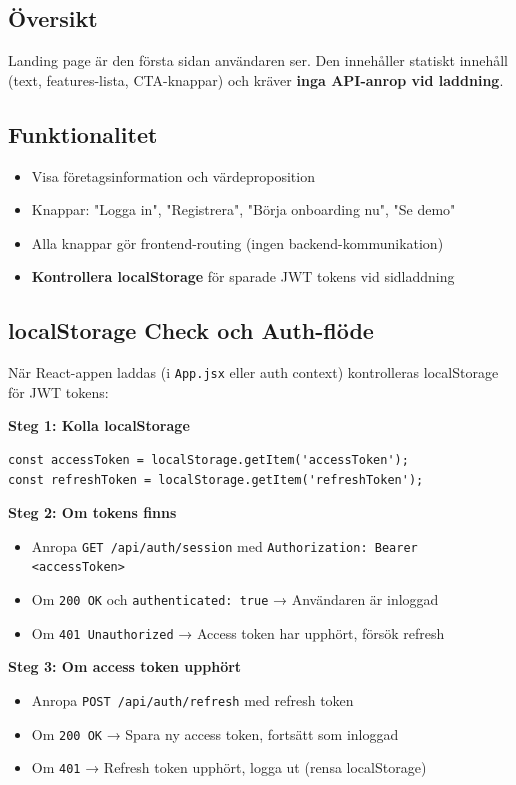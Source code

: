 \documentclass[12pt,a4paper]{article}
\begin{document}
\subsection{Översikt}
Landing page är den första sidan användaren ser. Den innehåller statiskt innehåll (text, features-lista, CTA-knappar) och kräver \textbf{inga API-anrop vid laddning}.

\subsection{Funktionalitet}
\begin{itemize}[noitemsep]
  \item Visa företagsinformation och värdeproposition
  \item Knappar: "Logga in", "Registrera", "Börja onboarding nu", "Se demo"
  \item Alla knappar gör frontend-routing (ingen backend-kommunikation)
  \item \textbf{Kontrollera localStorage} för sparade JWT tokens vid sidladdning
\end{itemize}

\subsection{localStorage Check och Auth-flöde}
När React-appen laddas (i \texttt{App.jsx} eller auth context) kontrolleras localStorage för JWT tokens:

\textbf{Steg 1: Kolla localStorage}
\begin{verbatim}
const accessToken = localStorage.getItem('accessToken');
const refreshToken = localStorage.getItem('refreshToken');
\end{verbatim}

\textbf{Steg 2: Om tokens finns}
\begin{itemize}[noitemsep]
  \item Anropa \texttt{GET /api/auth/session} med \texttt{Authorization: Bearer <accessToken>}
  \item Om \texttt{200 OK} och \texttt{authenticated: true} → Användaren är inloggad
  \item Om \texttt{401 Unauthorized} → Access token har upphört, försök refresh
\end{itemize}

\textbf{Steg 3: Om access token upphört}
\begin{itemize}[noitemsep]
  \item Anropa \texttt{POST /api/auth/refresh} med refresh token
  \item Om \texttt{200 OK} → Spara ny access token, fortsätt som inloggad
  \item Om \texttt{401} → Refresh token upphört, logga ut (rensa localStorage)
\end{itemize}
\end{document}
